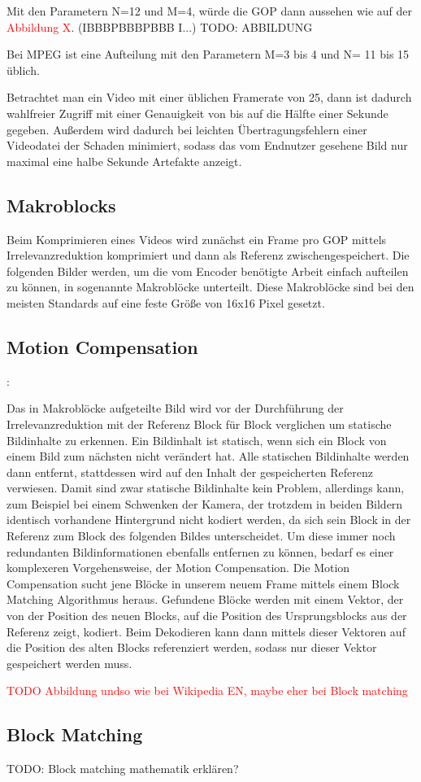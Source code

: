Mit den Parametern N=12 und M=4, würde die GOP dann aussehen wie auf der \textcolor{red}{Abbildung X}. (IBBBPBBBPBBB I...) TODO: ABBILDUNG 

Bei MPEG ist eine Aufteilung mit den Parametern M=3 bis 4 und N= 11 bis 15 üblich.

Betrachtet man ein Video mit einer üblichen Framerate von 25, dann ist dadurch wahlfreier Zugriff mit einer Genauigkeit von bis auf die Hälfte einer Sekunde gegeben. Außerdem wird dadurch bei leichten Übertragungsfehlern einer Videodatei der Schaden minimiert, sodass das vom Endnutzer gesehene Bild nur maximal eine halbe Sekunde Artefakte anzeigt.

\subsection{Makroblocks}

Beim Komprimieren eines Videos wird zunächst ein Frame pro GOP mittels Irrelevanzreduktion komprimiert und dann als Referenz zwischengespeichert. Die folgenden Bilder werden, um die vom Encoder benötigte Arbeit einfach aufteilen zu können, in sogenannte Makroblöcke unterteilt. Diese Makroblöcke sind bei den meisten Standards auf eine feste Größe von 16x16 Pixel gesetzt. 

\subsection{Motion Compensation}: 

Das in Makroblöcke aufgeteilte Bild wird vor der Durchführung der Irrelevanzreduktion mit der Referenz Block für Block verglichen um statische Bildinhalte zu erkennen. Ein Bildinhalt ist statisch, wenn sich ein Block von einem Bild zum nächsten nicht verändert hat. Alle statischen Bildinhalte werden dann entfernt, stattdessen wird auf den Inhalt der gespeicherten Referenz verwiesen. 
Damit sind zwar statische Bildinhalte kein Problem, allerdings kann, zum Beispiel bei einem Schwenken der Kamera, der trotzdem in beiden Bildern identisch vorhandene Hintergrund nicht kodiert werden, da sich sein Block in der Referenz zum Block des folgenden Bildes unterscheidet. Um diese immer noch redundanten Bildinformationen ebenfalls entfernen zu können, bedarf es einer komplexeren Vorgehensweise, der Motion Compensation.
Die Motion Compensation sucht jene Blöcke in unserem neuem Frame mittels einem Block Matching Algorithmus heraus. Gefundene Blöcke werden mit einem Vektor, der von der Position des neuen Blocks, auf die Position des Ursprungsblocks aus der Referenz zeigt, kodiert. Beim Dekodieren kann dann mittels dieser Vektoren auf die Position des alten Blocks referenziert werden, sodass nur dieser Vektor gespeichert werden muss.

\textcolor{red}{TODO Abbildung undso wie bei Wikipedia EN, maybe eher bei Block matching}

\subsection{Block Matching}

TODO: Block matching mathematik erklären?